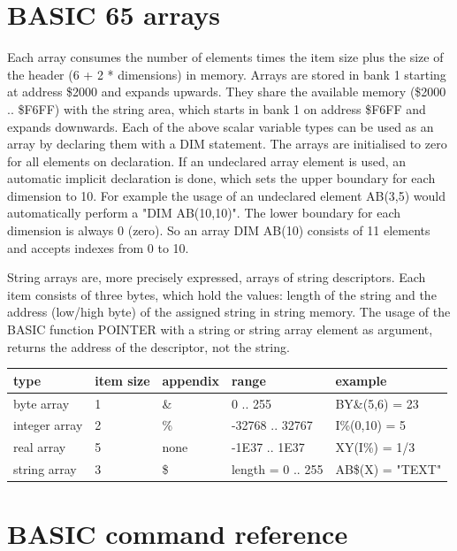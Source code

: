 \section{BASIC 65 arrays}

Each array consumes the number of elements times the item size
plus the size of the header (6 + 2 * dimensions) in memory.
Arrays are stored in bank 1 starting at address \$2000 and expands upwards.
They share the available memory (\$2000 .. \$F6FF) with the string area,
which starts in bank 1 on address \$F6FF and expands downwards.
Each of the above scalar variable types can be used as an array by declaring
them with a DIM statement. The arrays are initialised to zero for all
elements on declaration. If an undeclared array element is used,
an automatic implicit declaration is done, which sets the upper  boundary
for each dimension to 10. For example the usage of an undeclared element
AB(3,5) would automatically perform a "DIM AB(10,10)".
The lower boundary for each dimension is always 0 (zero).
So an array DIM AB(10) consists of 11 elements and accepts indexes from
0 to 10.

String arrays are, more precisely expressed, arrays of string
descriptors. Each item consists of three bytes, which hold
the values: length of the string and the address (low/high byte)
of the assigned string in string memory.
The usage of the BASIC function POINTER with a string or
string array element as argument, returns the address of the descriptor, not the string.

{\ttfamily
\setlength{\tabcolsep}{1mm}
\begin{tabular}{|l|l|l|l|l|}
\hline
 type          & item size & appendix & range    & example  \\
\hline
byte     array &  1     &    \&    & 0 .. 255        & BY\&(5,6) = 23 \\
integer  array &  2     &    \%    & -32768 .. 32767 & I\%(0,10) = 5    \\
real     array &  5     &   none   & -1E37 .. 1E37   & XY(I\%) = 1/3   \\
string   array &  3     &    \$    & length = 0 .. 255 & AB\$(X) = "TEXT" \\
\hline
\end{tabular}
}








\newpage
\section{BASIC command reference}

